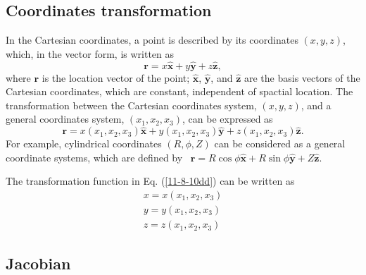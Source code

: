 \documentclass{llncs}
\begin{document}
\subsection{Coordinates transformation}

In the Cartesian coordinates, a point is described by its coordinates $(x, y,
z)$, which, in the vector form, is written as
\begin{equation}
  \mathbf{r}= x \hat{\mathbf{x}} + y \hat{\mathbf{y}} + z \hat{\mathbf{z}},
\end{equation}
where $\mathbf{r}$ is the location vector of the point; $\hat{\mathbf{x}}$,
$\hat{\mathbf{y}}$, and $\hat{\mathbf{z}}$ are the basis vectors of the
Cartesian coordinates, which are constant, independent of spactial location.
The transformation between the Cartesian coordinates system, $(x, y, z)$, and
a general coordinates system, $(x_1, x_2, x_3)$, can be expressed as
\begin{equation}
  \label{11-8-10dd} \mathbf{r}= x (x_1, x_2, x_3) \hat{\mathbf{x}} + y (x_1,
  x_2, x_3) \hat{\mathbf{y}} + z (x_1, x_2, x_3) \hat{\mathbf{z}} .
\end{equation}
For example, cylindrical coordinates $(R, \phi, Z)$ can be considered as a
general coordinate systems, which are defined by \ $\mathbf{r}= R \cos \phi
\hat{\mathbf{x}} + R \sin \phi \hat{\mathbf{y}} + Z \hat{\mathbf{z}}$.

The transformation function in Eq. (\ref{11-8-10dd}) can be written as
\begin{equation}
  \label{11-8-10} \begin{array}{l}
    x = x (x_1, x_2, x_3)\\
    y = y (x_1, x_2, x_3)\\
    z = z (x_1, x_2, x_3)
  \end{array}
\end{equation}

\subsection{Jacobian}
\end{document}
